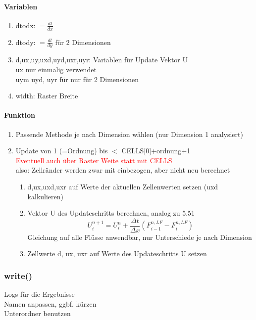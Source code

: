 \documentclass[12pt]{article}
\begin{document}
\paragraph{Variablen}
\begin{enumerate}
	\item dtodx: $= \frac{dt}{dx}$
	\item dtody: $= \frac{dt}{dy}$ für 2 Dimensionen
	\item d,ux,uy,uxd,uyd,uxr,uyr: Variablen für Update Vektor U\\
	ux nur einmalig verwendet\\
	uym uyd, uyr für nur für 2 Dimensionen
	\item width: Raster Breite
\end{enumerate}

\paragraph{Funktion}
\renewcommand{\labelenumi}{\theenumi.} 
\begin{enumerate}
	\item Passende Methode je nach Dimension wählen (nur Dimension 1 analysiert)
	\item Update von 1 (=Ordnung) bis $<$ CELLS[0]+ordnung+1\\
	\textcolor{red}{Eventuell auch über Raster Weite statt mit CELLS}\\
	also: Zellränder werden zwar mit einbezogen, aber nicht neu berechnet
	\begin{enumerate}
		\item d,ux,uxd,uxr auf Werte der aktuellen Zellenwerten setzen (uxd kalkulieren)
		\item Vektor U des Updateschritts berechnen, analog zu 5.51\\
		\begin{equation}
		U_i^{n+1} = U_i^n + \frac{\Delta t}{\Delta x}\left(F_{i-1}^{n,LF} - F_{i}^{n,LF}\right)\label{eq:update_LF}
		\end{equation}
		Gleichung auf alle Flüsse anwendbar, nur Unterschiede je nach Dimension
		\item Zellwerte d, ux, uxr auf Werte des Updateschritts U setzen
	\end{enumerate}
\end{enumerate}


\subsubsection{write()} \label{sssec:write}
Logs für die Ergebnisse\\
Namen anpassen, ggbf. kürzen\\
Unterordner benutzen
\end{document}
